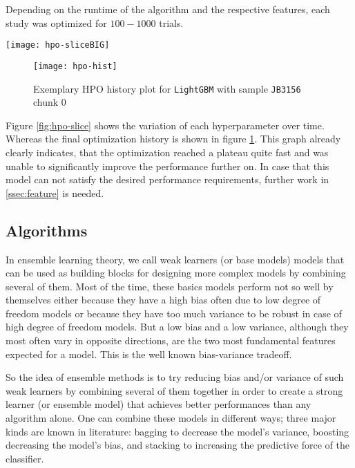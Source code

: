 Depending on the runtime of the algorithm and the respective features, each study was optimized for $100 - 1000$ trials.


\begin{figure*}[bt]
	\centering
	\texttt{[image: hpo-sliceBIG]}
	\caption{Exemplary HPO slice plot for \texttt{LightGBM} with sample \texttt{JB3156} chunk 0}
	\label{fig:hpo-slice}
\end{figure*}

\begin{figure}[h]
	\centering
	\texttt{[image: hpo-hist]}
	\caption{Exemplary HPO history plot for \texttt{LightGBM} with sample \texttt{JB3156} chunk 0}
	\label{fig:hpo-hist}
\end{figure}

Figure \ref{fig:hpo-slice} shows the variation of each hyperparameter over time.
Whereas the final optimization history is shown in figure \ref{fig:hpo-hist}.
This graph already clearly indicates, that the optimization reached a plateau quite fast and was unable to significantly improve the performance further on.
In case that this model can not satisfy the desired performance requirements, further work in \ref{ssec:feature} is needed.










\subsection{Algorithms}\label{ssec:algorithms}
In ensemble learning theory, we call weak learners (or base models) models that can be used as building blocks for designing more complex models by combining several of them.
Most of the time, these basics models perform not so well by themselves either because they have a high bias often due to low degree of freedom models or because they have too much variance to be robust in case of high degree of freedom models.
But a low bias and a low variance, although they most often vary in opposite directions, are the two most fundamental features expected for a model. 
This is the well known bias-variance tradeoff.

So the idea of ensemble methods is to try reducing bias and/or variance of such weak learners by combining several of them together in order to create a strong learner (or ensemble model) that achieves better performances than any algorithm alone.
One can combine these models in different ways; three major kinds are known in literature: bagging to decrease the model’s variance, boosting decreasing the model’s bias, and stacking to increasing the predictive force of the classifier.

